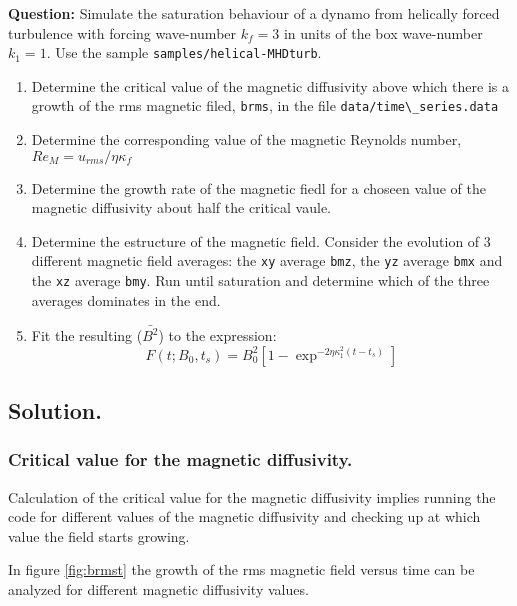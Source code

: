 
\textbf{Question:} Simulate the saturation behaviour of a dynamo from helically forced turbulence with forcing wave-number $k_f = 3$ in units of the box wave-number $k_1 = 1$. Use the sample  \texttt{samples/helical-MHDturb}.
\begin{enumerate}
 \item Determine the critical value of the magnetic diffusivity above which there is a growth of the rms magnetic filed, \verb|brms|, in the file \verb|data/time\_series.data|
\item Determine the corresponding value of the magnetic Reynolds number, $Re_M = u_{rms}/\eta \kappa_f$
\item Determine the growth rate of the magnetic fiedl for a choseen value of the magnetic diffusivity about half the critical vaule. 
\item Determine the estructure of the magnetic field. Consider the evolution of 3 different magnetic field averages: the \verb|xy| average \verb|bmz|, the \verb|yz| average \verb|bmx| and the \verb|xz| average \verb|bmy|. Run until saturation and determine which of the three averages dominates in the end.
\item Fit the resulting ($\bar{B^2}$) to the expression:
\begin{equation}
 F(t;B_0,t_s)=B_0^2[1-\exp^{-2\eta\kappa_1^2(t-t_s)}]
\label{eq:fitB}
\end{equation}
\end{enumerate}

\subsection{Solution.}

\subsubsection{Critical value for the magnetic diffusivity.}

Calculation of the critical value for the magnetic diffusivity implies running the code for different values of the magnetic diffusivity and checking up at which value the field starts growing.

In figure \ref{fig:brmst} the growth of the rms magnetic field versus time can be analyzed for different magnetic diffusivity values.


